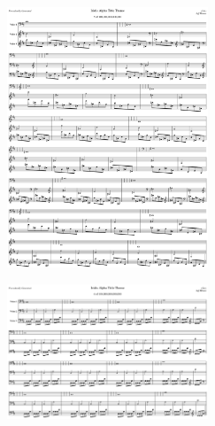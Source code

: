 \begin{figure}[H]
{
  \setlength{\tabcolsep}{3.0pt}
  \setlength\cmidrulewidth{\heavyrulewidth} %
    \begin{subfigure}{0.5\textwidth}
  \includegraphics[width=6cm]{music/title_no_5_page_1001.png}%
    \end{subfigure}
  \begin{subfigure}{0.5\textwidth}
  \includegraphics[width=6cm]{music/title_no_6_page_1001.png}%
    \end{subfigure}
}
\end{figure}


